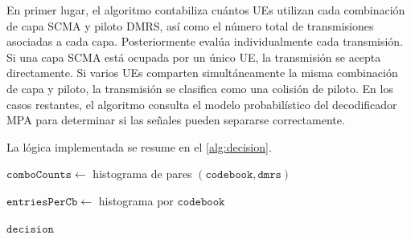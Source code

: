 En primer lugar, el algoritmo contabiliza cuántos UEs utilizan cada combinación de capa SCMA y piloto DMRS, así como el número total de transmisiones asociadas a cada capa. Posteriormente evalúa individualmente cada transmisión. Si una capa SCMA está ocupada por un único UE, la transmisión se acepta directamente. Si varios UEs comparten simultáneamente la misma combinación de capa y piloto, la transmisión se clasifica como una colisión de piloto. En los casos restantes, el algoritmo consulta el modelo probabilístico del decodificador MPA para determinar si las señales pueden separarse correctamente.

La lógica implementada se resume en el \cref{alg:decision}.


\begin{algorithm}[H]
\DontPrintSemicolon
\caption{Lógica de decisión para las transmisiones MSG3}
\label{alg:decision}


$\mathtt{comboCounts}\leftarrow$ histograma de pares $(\mathtt{codebook},\mathtt{dmrs})$\;

$\mathtt{entriesPerCb}\leftarrow$ histograma por $\mathtt{codebook}$\;


\Return $\mathtt{decision}$\;

\end{algorithm}

